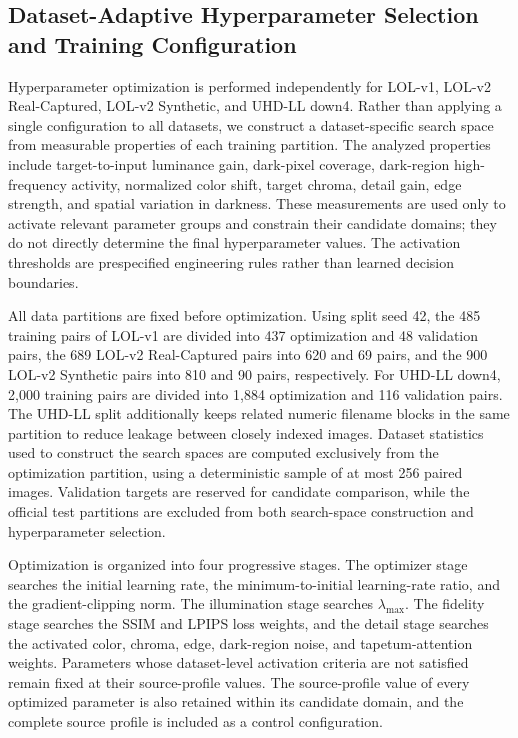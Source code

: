 \subsection{Dataset-Adaptive Hyperparameter Selection and Training Configuration}
\label{subsec:implementation_details}

Hyperparameter optimization is performed independently for LOL-v1, LOL-v2
Real-Captured, LOL-v2 Synthetic, and UHD-LL down4. Rather than applying a
single configuration to all datasets, we construct a dataset-specific search
space from measurable properties of each training partition. The analyzed
properties include target-to-input luminance gain, dark-pixel coverage,
dark-region high-frequency activity, normalized color shift, target chroma,
detail gain, edge strength, and spatial variation in darkness. These
measurements are used only to activate relevant parameter groups and constrain
their candidate domains; they do not directly determine the final
hyperparameter values. The activation thresholds are prespecified engineering
rules rather than learned decision boundaries.

All data partitions are fixed before optimization. Using split seed 42, the
485 training pairs of LOL-v1 are divided into 437 optimization and 48
validation pairs, the 689 LOL-v2 Real-Captured pairs into 620 and 69 pairs,
and the 900 LOL-v2 Synthetic pairs into 810 and 90 pairs, respectively. For
UHD-LL down4, 2,000 training pairs are divided into 1,884 optimization and
116 validation pairs. The UHD-LL split additionally keeps related numeric
filename blocks in the same partition to reduce leakage between closely
indexed images. Dataset statistics used to construct the search spaces are
computed exclusively from the optimization partition, using a deterministic
sample of at most 256 paired images. Validation targets are reserved for
candidate comparison, while the official test partitions are excluded from
both search-space construction and hyperparameter selection.

Optimization is organized into four progressive stages. The optimizer stage
searches the initial learning rate, the minimum-to-initial learning-rate ratio,
and the gradient-clipping norm. The illumination stage searches
$\lambda_{\max}$. The fidelity stage searches the SSIM and LPIPS loss weights,
and the detail stage searches the activated color, chroma, edge, dark-region
noise, and tapetum-attention weights. Parameters whose dataset-level activation
criteria are not satisfied remain fixed at their source-profile values. The
source-profile value of every optimized parameter is also retained within its
candidate domain, and the complete source profile is included as a control
configuration.

